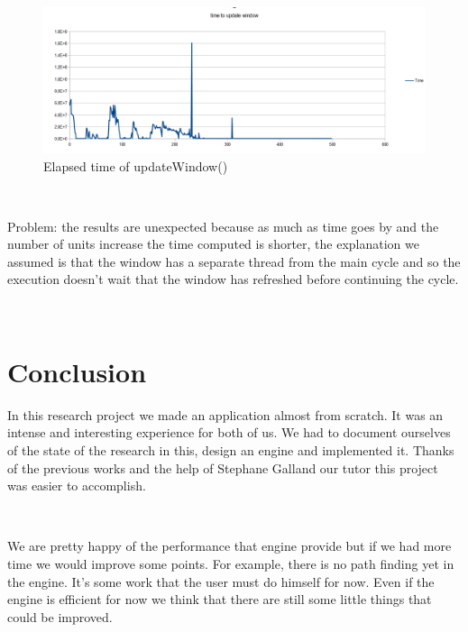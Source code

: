 \documentclass[a4paper,10pt]{book}
\begin{document}
~

\begin{figure}[ht]
 \includegraphics[scale=0.5]{updateWindow}
 \caption{Elapsed time of updateWindow()}
\end{figure}

~

Problem: the results are unexpected because as much as time goes by and the number of units increase the time computed is shorter, the explanation we assumed is that the window has a separate thread from the main cycle and so the execution doesn't wait that the window has refreshed before continuing the cycle.

~

\chapter {Conclusion}

In this research project we made an application almost from scratch. It was an intense and interesting experience for both of us. We had to document ourselves of the state of the research in this, design an engine and implemented it. Thanks of the previous works and the help of Stephane Galland our tutor this project was easier to accomplish. 

~

We are pretty happy of the performance that engine provide but if we had more time we would improve some points. For example, there is no path finding yet in the engine. It's some work that the user must do himself for now. Even if the engine is efficient for now we think that there are still some little things that could be improved.
\end{document}
